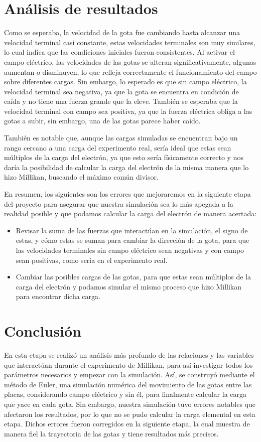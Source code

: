 \documentclass[
 reprint,
 amsmath,amssymb,
 aps,
]{revtex4-2}
\begin{document}
\section{An\'alisis de resultados}

Como se esperaba, la velocidad de la gota fue cambiando hasta alcanzar una velocidad terminal casi constante, estas velocidades terminales son muy similares, lo cual indica que las condiciones iniciales fueron consistentes. Al activar el campo eléctrico, las velocidades de las gotas se alteran significativamente, algunas aumentan o disminuyen, lo que refleja correctamente el funcionamiento del campo sobre diferentes cargas. Sin embargo, lo esperado es que sin campo eléctrico, la velocidad terminal sea negativa, ya que la gota se encuentra en condición de caída y no tiene una fuerza grande que la eleve. También se esperaba que la velocidad terminal con campo sea positiva, ya que la fuerza eléctrica obliga a las gotas a subir, sin embargo, una de las gotas parece haber caído.

También es notable que, aunque las cargas simuladas se encuentran bajo un rango cercano a una carga del experimento real, sería ideal que estas sean múltiplos de la carga del electrón, ya que esto sería físicamente correcto y nos daría la posibilidad de calcular la carga del electrón de la misma manera que lo hizo Millikan, buscando el máximo común divisor.

En resumen, los siguientes son los errores que mejoraremos en la siguiente etapa del proyecto para asegurar que nuestra simulación sea lo más apegada a la realidad posible y que podamos calcular la carga del electrón de manera acertada:
\begin{itemize}
    \item Revisar la suma de las fuerzas que interactúan en la simulación, el signo de estas, y cómo estas se suman para cambiar la dirección de la gota, para que las velocidades terminales sin campo eléctrico sean negativas y con campo sean positivas, como sería en el experimento real.
    \item Cambiar las posibles cargas de las gotas, para que estas sean múltiplos de la carga del electrón y podamos simular el mismo proceso que hizo Millikan para encontrar dicha carga.
\end{itemize}

\section{Conclusi\'on}
En esta etapa se realizó un análisis más profundo de las relaciones y las variables que interactúan durante el experimento de Millikan, para así investigar todos los parámetros necesarios y empezar con la simulación. Así, se construyó mediante el método de Euler, una simulación numérica del movimiento de las gotas entre las placas, considerando campo eléctrico y sin él, para finalmente calcular la carga que yace en cada gota. Sin embargo, nuestra simulación tuvo errores notables que afectaron los resultados, por lo que no se pudo calcular la carga elemental en esta etapa. Dichos errores fueron corregidos en la siguiente etapa, la cual muestra de manera fiel la trayectoria de las gotas y tiene resultados más precisos.
\end{document}
